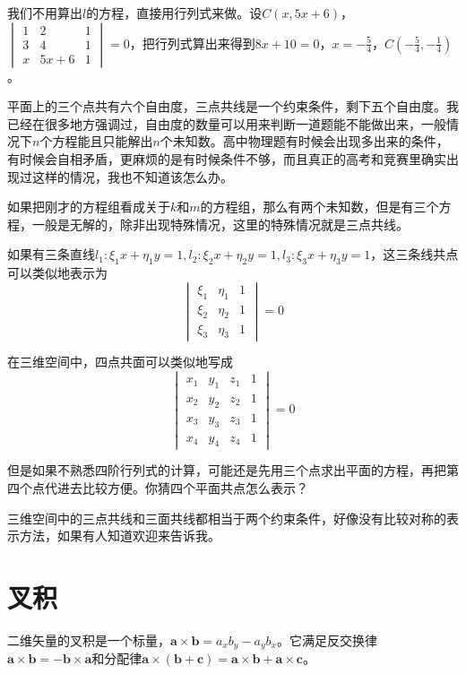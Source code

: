 我们不用算出$l$的方程，直接用行列式来做。设$C(x,5x+6)$，$\begin{vmatrix}
1 & 2 & 1 \\
3 & 4 & 1 \\
x & 5x+6 & 1
\end{vmatrix}=0$，把行列式算出来得到$8x+10=0$，$x=-\frac{5}{4}$，$C(-\frac{5}{4},-\frac{1}{4})$。

平面上的三个点共有六个自由度，三点共线是一个约束条件，剩下五个自由度。我已经在很多地方强调过，自由度的数量可以用来判断一道题能不能做出来，一般情况下$n$个方程能且只能解出$n$个未知数。高中物理题有时候会出现多出来的条件，有时候会自相矛盾，更麻烦的是有时候条件不够，而且真正的高考和竞赛里确实出现过这样的情况，我也不知道该怎么办。

如果把刚才的方程组看成关于$k$和$m$的方程组，那么有两个未知数，但是有三个方程，一般是无解的，除非出现特殊情况，这里的特殊情况就是三点共线。

如果有三条直线$l_1:\xi_1 x+\eta_1 y=1,l_2:\xi_2 x+\eta_2 y=1,l_3:\xi_3 x+\eta_3 y=1$，这三条线共点可以类似地表示为
\begin{equation*}
\begin{vmatrix}
\xi_1 & \eta_1 & 1 \\
\xi_2 & \eta_2 & 1 \\
\xi_3 & \eta_3 & 1
\end{vmatrix}=0
\end{equation*}

在三维空间中，四点共面可以类似地写成
\begin{equation*}
\begin{vmatrix}
x_1 & y_1 & z_1 & 1 \\
x_2 & y_2 & z_2 & 1 \\
x_3 & y_3 & z_3 & 1 \\
x_4 & y_4 & z_4 & 1
\end{vmatrix}=0
\end{equation*}

但是如果不熟悉四阶行列式的计算，可能还是先用三个点求出平面的方程，再把第四个点代进去比较方便。你猜四个平面共点怎么表示？

三维空间中的三点共线和三面共线都相当于两个约束条件，好像没有比较对称的表示方法，如果有人知道欢迎来告诉我。
\section{叉积}
二维矢量的叉积是一个标量，$\mathbf{a} \times \mathbf{b}=a_x b_y-a_y b_x$。它满足反交换律$\mathbf{a} \times \mathbf{b}=-\mathbf{b} \times \mathbf{a}$和分配律$\mathbf{a} \times (\mathbf{b}+\mathbf{c})=\mathbf{a} \times \mathbf{b}+\mathbf{a} \times \mathbf{c}$。

